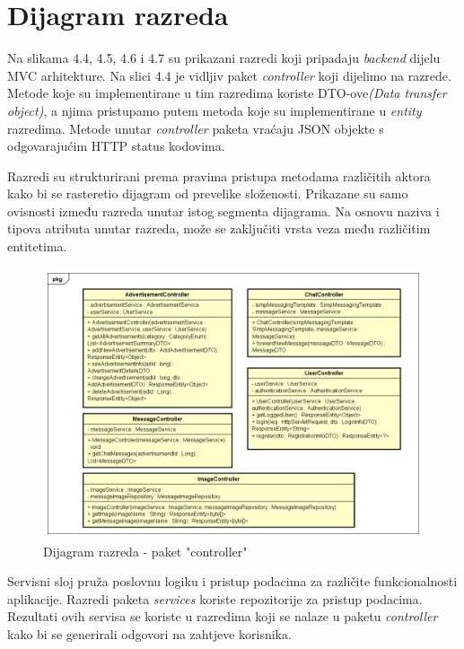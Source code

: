 			\eject
			
			
		\section{Dijagram razreda}

                \noindent Na slikama 4.4, 4.5, 4.6 i 4.7 su prikazani razredi koji pripadaju \textit{backend} dijelu MVC arhitekture. Na slici 4.4 je vidljiv paket \textit{controller} koji dijelimo na razrede. Metode koje su implementirane u tim razredima koriste DTO-ove\textit{(Data transfer object)}, a njima pristupamo putem metoda koje su implementirane u \textit{entity} razredima. Metode unutar \textit{controller} paketa vraćaju JSON objekte s odgovarajućim HTTP status kodovima.
			
			Razredi su strukturirani prema pravima pristupa metodama            različitih aktora kako bi se rasteretio dijagram od prevelike       složenosti. Prikazane su samo ovisnosti između razreda unutar       istog segmenta dijagrama. Na osnovu naziva i tipova atributa        unutar razreda, može se zaključiti vrsta veza među različitim       entitetima.

			\begin{figure}[htb]
				\centering
				\includegraphics[width=\textwidth]{slike/controllersUML.png}
				\caption{Dijagram razreda - paket "controller"}
			\end{figure}
			\pagebreak

                Servisni sloj pruža poslovnu logiku i pristup podacima za različite funkcionalnosti aplikacije. Razredi paketa \textit{services} koriste repozitorije za pristup podacima. Rezultati ovih servisa se koriste u razredima koji se nalaze u paketu \textit{controller} kako bi se generirali odgovori na zahtjeve korisnika.
   
